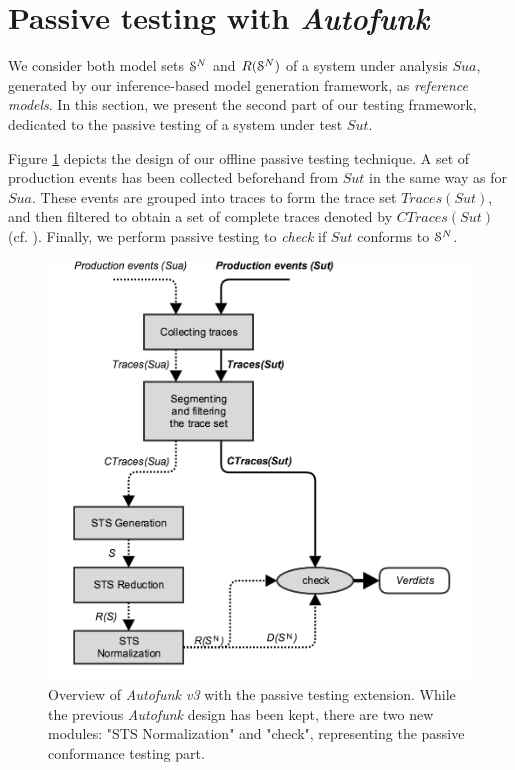 
\section{Passive testing with \textit{Autofunk}}
\label{sec:testing:passive}

We consider both model sets $\EuScript{S}^{N}$ and
$R(\EuScript{S}^{N})$ of a system under analysis $\mathit{Sua}$,
generated by our inference-based model generation framework, as
\emph{reference models}. In this section, we present the second
part of our testing framework, dedicated to the passive testing
of a system under test $\mathit{Sut}$.

Figure \ref{fig:passive-autofunk} depicts the design of our
offline passive testing technique. A set of production events has
been collected beforehand from $\mathit{Sut}$ in the same way as
for $\mathit{Sua}$. These events are grouped into traces to form
the trace set $Traces({Sut})$, and then filtered to obtain a set
of complete traces denoted by $CTraces({Sut})$ (cf.
).
Finally, we perform passive testing to \emph{check} if
$\mathit{Sut}$ conforms to $\EuScript{S}^{N}$.

\begin{figure}[h]
    \begin{center}
        \includegraphics[width=1.0\linewidth]{figures/passive_autofunk.png}
    \end{center}

    \caption{Overview of \textit{Autofunk v3} with the
    passive testing extension. While the previous
    \textit{Autofunk} design has been kept, there are
    two new modules: "STS Normalization" and "check",
    representing the passive conformance testing part.}
    \label{fig:passive-autofunk}
\end{figure}

